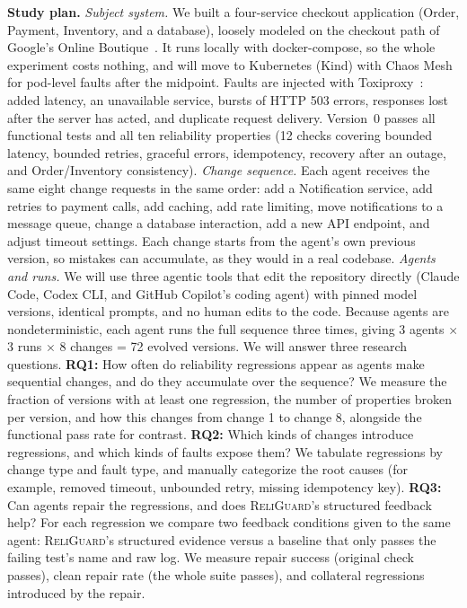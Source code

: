 \documentclass[sigconf,review]{acmart}
\begin{document}
\textbf{Study plan.} \emph{Subject system.} We built a four-service checkout
application (Order, Payment, Inventory, and a database), loosely
modeled on the checkout path of Google's Online Boutique~\cite{onlineboutique}. It runs
locally with docker-compose, so the whole experiment costs nothing,
and will move to Kubernetes (Kind) with Chaos Mesh~\cite{chaosmesh} for pod-level
faults after the midpoint. Faults are injected with Toxiproxy~\cite{toxiproxy}: added
latency, an unavailable service, bursts of HTTP 503 errors, responses
lost after the server has acted, and duplicate request delivery.
Version~0 passes all functional tests and all ten reliability properties
(12 checks covering bounded latency, bounded retries, graceful
errors, idempotency, recovery after an outage, and Order/Inventory
consistency). \emph{Change sequence.}
Each agent receives the same eight change requests in the same
order: add a Notification service, add retries to payment calls, add
caching, add rate limiting, move notifications to a message queue,
change a database interaction, add a new API endpoint, and adjust
timeout settings. Each change starts from the agent's own previous
version, so mistakes can accumulate, as they would in a real codebase. \emph{Agents and runs.}
We will use three agentic tools that edit the
repository directly (Claude Code, Codex CLI, and GitHub Copilot's
coding agent) with pinned model versions, identical prompts, and
no human edits to the code. Because agents are nondeterministic,
each agent runs the full sequence three times, giving 3 agents $\times$ 3
runs $\times$ 8 changes = 72 evolved versions. We will answer three research questions.
\textbf{RQ1:} How often do reliability regressions appear
as agents make sequential changes, and do they accumulate over
the sequence? We measure the fraction of versions with at least one
regression, the number of properties broken per version, and how
this changes from change 1 to change 8, alongside the functional
pass rate for contrast. \textbf{RQ2:} Which kinds of changes introduce
regressions, and which kinds of faults expose them? We tabulate
regressions by change type and fault type, and manually categorize
the root causes (for example, removed timeout, unbounded retry,
missing idempotency key). \textbf{RQ3:} Can agents repair the regressions,
and does \textsc{ReliGuard}'s structured feedback help? For each regression we compare two feedback conditions given to the same agent:
\textsc{ReliGuard}'s structured evidence versus a baseline that only passes
the failing test's name and raw log. We measure repair success
(original check passes), clean repair rate (the whole suite passes),
and collateral regressions introduced by the repair.
\end{document}
